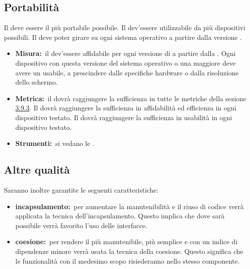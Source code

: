 	\subsection{Portabilità}
		Il  deve essere il più portabile possibile. Il  dev'essere utilizzabile da più dispositivi possibili. Il  deve poter girare su ogni sistema operativo  a partire dalla versione .
		\begin{itemize}
			\item \textbf{Misura:}\ il  dev'essere affidabile per ogni versione di  a partire dalla . Ogni dispositivo con questa versione del sistema operativo o una maggiore deve avere un  usabile, a prescindere dalle specifiche hardware o dalla risoluzione dello schermo.
			\item \textbf{Metrica:}\ il  dovrà raggiungere la sufficienza in tutte le metriche della sezione \hyperref[sec:3.9.3]{3.9.3}. Il  dovrà raggiungere la sufficienza in affidabilità ed efficienza in ogni dispositivo testato. Il  dovrà raggiungere la sufficienza in usabilità in ogni dispositivo testato.
			\item \textbf{Strumenti:}\ si vedano le \NPdoc.
		\end{itemize}
	\subsection{Altre qualità}
		Saranno inoltre garantite le seguenti caratteristiche:
		\begin{itemize}
			\item \textbf{incapsulamento:}\ per aumentare la manutenibilità e il riuso di codice verrà applicata la tecnica dell'incapsulamento. Questo implica che dove sarà possibile verrà favorito l'uso delle interfacce.
			\item \textbf{coesione:}\ per rendere il  più manutenibile, più semplice e con un indice di dipendenze minore verrà usata la tecnica della coesione. Questo significa che le funzionalità con il medesimo scopo risiederanno nello stesso componente.
		\end{itemize}
